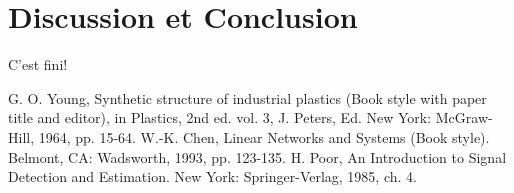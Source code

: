 \documentclass[letterpaper, 10 pt, conference]{ieeeconf}  %
\begin{document}
\section{Discussion et Conclusion}

C'est fini!

\addtolength{\textheight}{-12cm}   %




\begin{thebibliography}{99}
 G. O. Young, Synthetic structure of industrial plastics (Book style with paper title and editor), 	in Plastics, 2nd ed. vol. 3, J. Peters, Ed.  New York: McGraw-Hill, 1964, pp. 15-64.
 W.-K. Chen, Linear Networks and Systems (Book style).	Belmont, CA: Wadsworth, 1993, pp. 123-135.
 H. Poor, An Introduction to Signal Detection and Estimation.   New York: Springer-Verlag, 1985, ch. 4.
\end{thebibliography}
\end{document}
